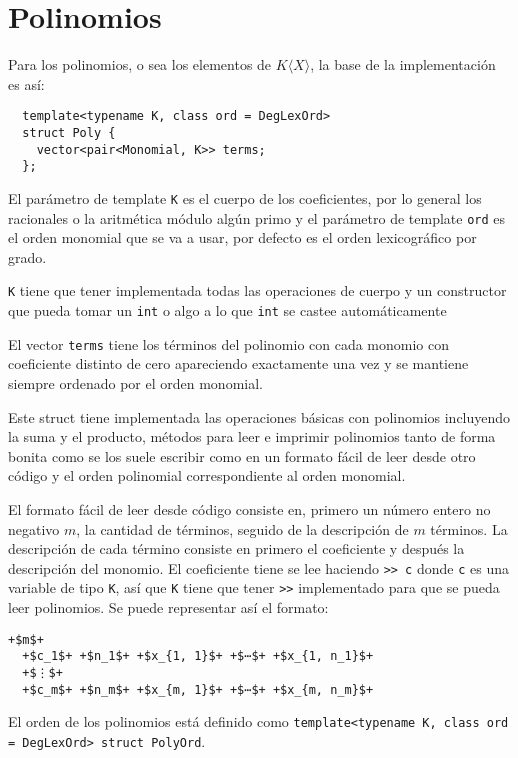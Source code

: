 \documentclass{report}
\theoremstyle{customstyle}
\theoremstyle{factstyle}
\begin{document}
\section{Polinomios}

Para los polinomios, o sea los elementos de $K⟨X⟩$, la base de la implementación es así:

\begin{verbatim}
  template<typename K, class ord = DegLexOrd>
  struct Poly {
    vector<pair<Monomial, K>> terms;
  };
\end{verbatim}

El parámetro de template \texttt{K} es el cuerpo de los coeficientes, por lo general los racionales o la aritmética módulo algún primo y el parámetro de template \texttt{ord} es el orden monomial que se va a usar, por defecto es el orden lexicográfico por grado.

\texttt{K} tiene que tener implementada todas las operaciones de cuerpo y un constructor que pueda tomar un \texttt{int} o algo a lo que \texttt{int} se castee automáticamente

El vector \texttt{terms} tiene los términos del polinomio con cada monomio con coeficiente distinto de cero apareciendo exactamente una vez y se mantiene siempre ordenado por el orden monomial.

Este struct tiene implementada las operaciones básicas con polinomios incluyendo la suma y el producto, métodos para leer e imprimir polinomios tanto de forma bonita como se los suele escribir como en un formato fácil de leer desde otro código y el orden polinomial correspondiente al orden monomial.

El formato fácil de leer desde código consiste en, primero un número entero no negativo $m$, la cantidad de términos, seguido de la descripción de $m$ términos. La descripción de cada término consiste en primero el coeficiente y después la descripción del monomio. El coeficiente tiene se lee haciendo \texttt{>> c} donde \texttt{c} es una variable de tipo \texttt{K}, así que \texttt{K} tiene que tener \texttt{>>} implementado para que se pueda leer polinomios. Se puede representar así el formato:

\begin{lstlisting}[escapechar=+]
  +$m$+
  +$c_1$+ +$n_1$+ +$x_{1, 1}$+ +$⋯$+ +$x_{1, n_1}$+
  +$⋮$+
  +$c_m$+ +$n_m$+ +$x_{m, 1}$+ +$⋯$+ +$x_{m, n_m}$+
\end{lstlisting}

El orden de los polinomios está definido como \texttt{template<typename K, class ord = DegLexOrd> struct PolyOrd}.
\end{document}
